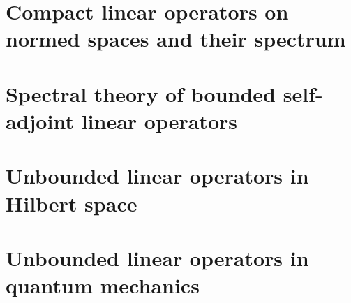 \documentclass{bookSolutions}
\begin{document}
\section{Compact linear operators on normed spaces and their spectrum}


\section{Spectral theory of bounded self-adjoint linear operators}


\section{Unbounded linear operators in Hilbert space}


\section{Unbounded linear operators in quantum mechanics}

\end{document}
